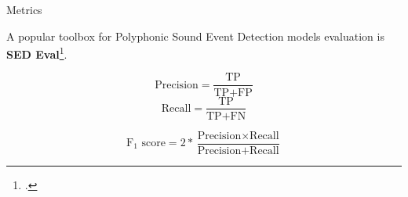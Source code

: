	\begin{frame}{Metrics}
	
		A popular toolbox for Polyphonic Sound Event Detection models evaluation is \textbf{SED Eval}\footcite{app6060162}.
	
		\begin{multicols}{2}
  			\begin{equation*}
    			\text{Precision} = \frac{\text{TP}}{\text{TP} + \text{FP}}
  			\end{equation*}\break
  			\begin{equation*}
    			\text{Recall} = \frac{\text{TP}}{\text{TP} + \text{FN}}
  			\end{equation*}
		\end{multicols}

		$$
			\text{F$_{1}$ score} = 2 * \frac{\text{Precision} \times \text{Recall}}{\text{Precision} + \text{Recall}}
		$$
		
		\note{
			\dots
		}
	\end{frame}